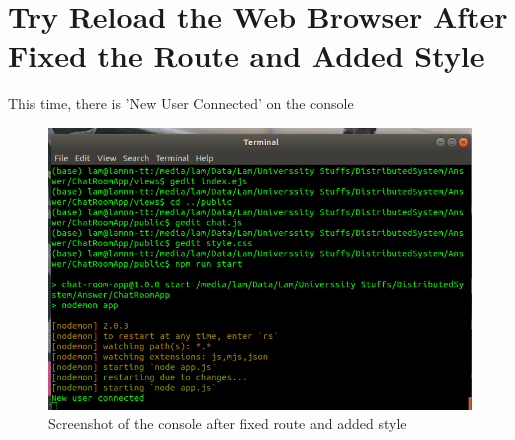 \documentclass[11pt,a4paper]{article}
\begin{document}
	\section{Try Reload the Web Browser After Fixed the Route and Added Style}
	This time, there is 'New User Connected' on the console
	\begin{figure}[h!]
  		\includegraphics[width=\linewidth]{reload-web-after.png}
  		\caption{Screenshot of the console after fixed route and added style}
  		\label{fig:console2}
	\end{figure}
	
\end{document}
